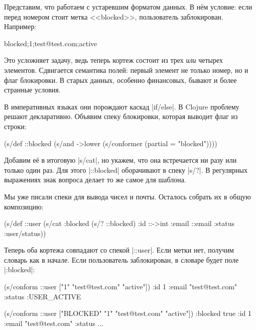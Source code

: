 Представим, что работаем с устаревшим форматом данных. В н\"{е}м условие: если
перед номером стоит метка <<blocked>>, пользователь заблокирован. Например:

\begin{english}
  \begin{text}
blocked;1;test@test.com;active
  \end{text}
\end{english}

Это усложняет задачу, ведь теперь кортеж состоит из трех \emph{или} четырех
элементов. Сдвигается семантика полей: первый элемент не только номер, но и флаг
блокировки. В старых данных, особенно финансовых, бывают и более странные
условия.

В императивных языках они порождают каскад \spverb|if/else|. В Clojure проблему
решают декларативно. Объявим спеку блокировки, которая выводит флаг из строки:

\begin{english}
  \begin{clojure}
(s/def ::blocked
  (s/and
   ->lower
   (s/conformer (partial = "blocked"))))
  \end{clojure}
\end{english}


Добавим е\"{е} в итоговую \spverb|s/cat|, но укажем, что она встречается ни разу
или только один раз. Для этого \spverb|::blocked| оборачивают в спеку
\spverb|s/?|.  В регулярных выражениях знак вопроса делает то же самое для
шаблона.

Мы уже писали спеки для вывода чисел и почты. Осталось собрать их в общую
композицию:

\begin{english}
  \begin{clojure}
(s/def ::user
  (s/cat :blocked (s/? ::blocked)
         :id ::->int
         :email ::email
         :status :user/status))
  \end{clojure}
\end{english}

Теперь оба кортежа совпадают со спекой \spverb|::user|. Если метки нет, получим
словарь как в начале. Если пользователь заблокирован, в словаре будет поле
\spverb|:blocked|:

\begin{english}
  \begin{clojure}
(s/conform ::user ["1" "test@test.com" "active"])
{:id 1 :email "test@test.com" :status :USER_ACTIVE}

(s/conform ::user ["BLOCKED" "1" "test@test.com" "active"])
{:blocked true :id 1 :email "test@test.com" :status ...}
  \end{clojure}
\end{english}

